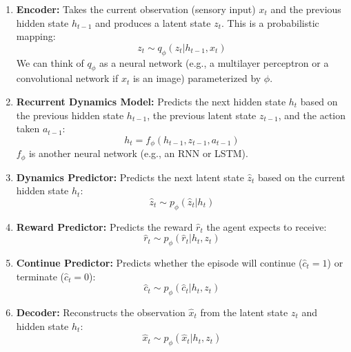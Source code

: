 \begin{enumerate}
    \item \textbf{Encoder:} Takes the current observation (sensory input) $x_t$ and the previous hidden state $h_{t-1}$ and produces a latent state $z_t$. This is a probabilistic mapping:
        \begin{equation}
            z_t \sim q_\phi(z_t | h_{t-1}, x_t)
        \end{equation}
        We can think of $q_\phi$ as a neural network (e.g., a multilayer perceptron or a convolutional network if $x_t$ is an image) parameterized by $\phi$.

    \item \textbf{Recurrent Dynamics Model:} Predicts the next hidden state $h_t$ based on the previous hidden state $h_{t-1}$, the previous latent state $z_{t-1}$, and the action taken $a_{t-1}$:
        \begin{equation}
            h_t = f_\phi(h_{t-1}, z_{t-1}, a_{t-1})
        \end{equation}
        $f_\phi$ is another neural network (e.g., an RNN or LSTM).

    \item \textbf{Dynamics Predictor:} Predicts the next latent state $\hat{z}_t$ based on the current hidden state $h_t$:
        \begin{equation}
            \hat{z}_t \sim p_\phi(\hat{z}_t | h_t)
        \end{equation}

    \item \textbf{Reward Predictor:} Predicts the reward $\hat{r}_t$ the agent expects to receive:
        \begin{equation}
            \hat{r}_t \sim p_\phi(\hat{r}_t | h_t, z_t)
        \end{equation}

    \item \textbf{Continue Predictor:} Predicts whether the episode will continue ($\hat{c}_t = 1$) or terminate ($\hat{c}_t = 0$):
        \begin{equation}
            \hat{c}_t \sim p_\phi(\hat{c}_t | h_t, z_t)
        \end{equation}

    \item \textbf{Decoder:} Reconstructs the observation $\hat{x}_t$ from the latent state $z_t$ and hidden state $h_t$:
        \begin{equation}
            \hat{x}_t \sim p_\phi(\hat{x}_t | h_t, z_t)
        \end{equation}
\end{enumerate}

